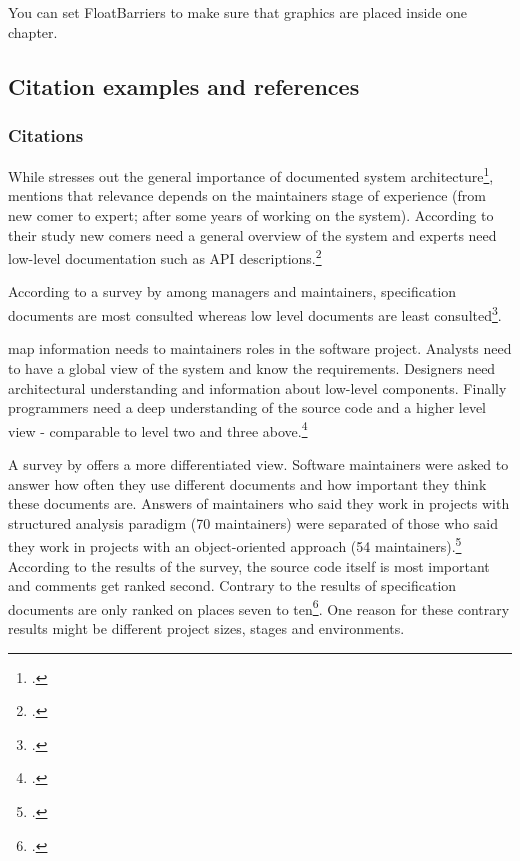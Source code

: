 You can set FloatBarriers to make sure that graphics are placed inside one
chapter.

\FloatBarrier %
\newpage





\subsection{Citation examples and references}
\label{sec:citation}

\subsubsection{Citations}

While \citeauthor{tilley_1992} stresses out the general importance of documented
system architecture\footcite[Cf.][]{tilley_1992}, 
\citeauthor{cioch_96} mentions that relevance depends on the
maintainers stage of experience (from new comer to expert; after some years of
working on the system). According to their study new comers need a general
overview of the system and experts need low-level documentation such as API
descriptions.\footcite[Cf.][]{cioch_96}

According to a survey by \citeauthor{forward_relevance_2002} among managers and
maintainers, specification documents are most consulted whereas low level
documents are least consulted\footcite[Cf.][28-30]{forward_relevance_2002}.

\citeauthor{grubb2003software} map information needs to maintainers roles
in the software project. Analysts need to have a global view of the system and
know the requirements. Designers need architectural understanding and
information about low-level components. Finally programmers need a deep
understanding of the source code and a higher level view - comparable to level
two and three above.\footcite[Cf.][103-106]{grubb2003software}

A survey by \citeauthor{de_souza_study_2005} offers a more differentiated view.
Software maintainers were asked to answer how often they use different documents
and how important they think these documents are. Answers of maintainers who
said they work in projects with structured analysis paradigm (70 maintainers)
were separated of those who said they work in projects with an object-oriented
approach (54 maintainers).\footcite[Cf.][69-74]{de_souza_study_2005}
According to the results of the survey, the source code itself is most important
and comments get ranked second. Contrary to the results of \citeauthor{forward_relevance_2002}
specification documents are only ranked on places seven to
ten\footcite[Cf.][98]{huang_towards_2003}. One reason for these contrary results
might be different project sizes, stages and environments.

